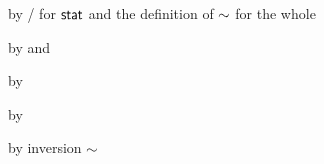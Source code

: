 \begin{lamportproof}
    \begin{pfproof}
      \qedstep
        \begin{pfproof}
          by / for $\mathsf{stat}$ and the definition of $\sim$ for the whole
        \end{pfproof}
    \end{pfproof}

    \begin{pfproof}
      \qedstep
        \begin{pfproof}
          by  and 
        \end{pfproof}
    \end{pfproof}

    \begin{pfproof}
      \qedstep
        \begin{pfproof}
          by 
        \end{pfproof}
    \end{pfproof}

    \begin{pfproof}
      \qedstep
        \begin{pfproof}
          by 
        \end{pfproof}
    \end{pfproof}

    \begin{pfproof}
      \qedstep
        \begin{pfproof}
          by inversion $\sim$
        \end{pfproof}
    \end{pfproof}


\end{lamportproof}
